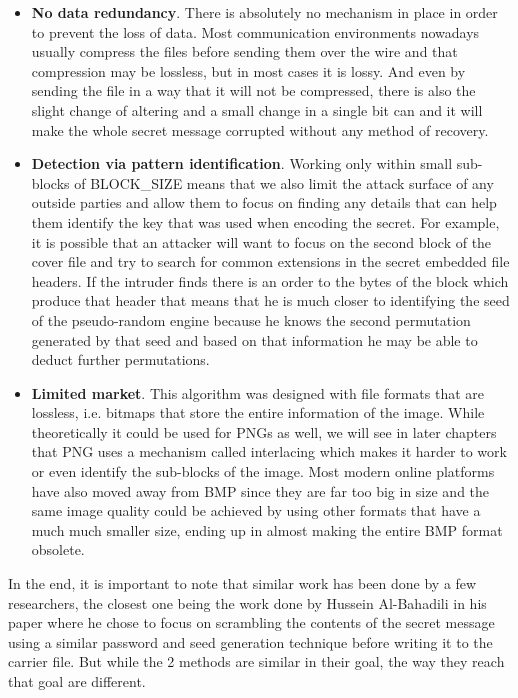 \begin{itemize}
  \item \textbf{No data redundancy}. There is absolutely no mechanism in place in order to prevent the loss of data. Most communication environments nowadays usually compress the files before sending them over the wire and that compression may be lossless, but in most cases it is lossy. And even by sending the file in a way that it will not be compressed, there is also the slight change of altering and a small change in a single bit can and it will make the whole secret message corrupted without any method of recovery.
  \item \textbf{Detection via pattern identification}. Working only within small sub-blocks of BLOCK\_SIZE means that we also limit the attack surface of any outside parties and allow them to focus on finding any details that can help them identify the key that was used when encoding the secret. For example, it is possible that an attacker will want to focus on the second block of the cover file and try to search for common extensions in the secret embedded file headers. If the intruder finds there is an order to the bytes of the block which produce that header that means that he is much closer to identifying the seed of the pseudo-random engine because he knows the second permutation generated by that seed and based on that information he may be able to deduct further permutations.
  \item \textbf{Limited market}. This algorithm was designed with file formats that are lossless, i.e. bitmaps that store the entire information of the image. While theoretically it could be used for PNGs as well, we will see in later chapters that PNG uses a mechanism called interlacing which makes it harder to work or even identify the sub-blocks of the image. Most modern online platforms have also moved away from BMP since they are far too big in size and the same image quality could be achieved by using other formats that have a much much smaller size, ending up in almost making the entire BMP format obsolete.
\end{itemize}
In the end, it is important to note that similar work has been done by a few researchers, the closest one being the work done by Hussein Al-Bahadili\cite{secure_block_permutation} in his paper where he chose to focus on scrambling the contents of the secret message using a similar password and seed generation technique before writing it to the carrier file. But while the 2 methods are similar in their goal, the way they reach that goal are different.


